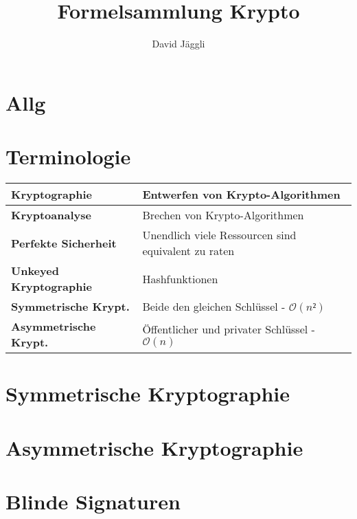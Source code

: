 \documentclass[12pt]{scrartcl}
\author{David Jäggli}
\title{Formelsammlung Krypto}
\begin{document}
\maketitle

\tableofcontents

\newpage
\section{Allg}


\section{Terminologie}


\renewcommand{\arraystretch}{1.5}
\begin{center}
    \begin{tabular}{ | m{12em} | m{25em} | }
        \hline
        \textbf{Kryptographie}         & Entwerfen von Krypto-Algorithmen                       \\
        \hline
        \textbf{Kryptoanalyse}         & Brechen von Krypto-Algorithmen                         \\
        \hline
        \textbf{Perfekte Sicherheit}   & Unendlich viele Ressourcen sind equivalent zu raten    \\
        \hline
        \textbf{Unkeyed Kryptographie} & Hashfunktionen                                         \\
        \hline
        \textbf{Symmetrische Krypt.}   & Beide den gleichen Schlüssel - $\mathcal{O}(n²)$       \\
        \hline
        \textbf{Asymmetrische Krypt.}  & Öffentlicher und privater Schlüssel - $\mathcal{O}(n)$ \\
        \hline
    \end{tabular}
\end{center}


\section{Symmetrische Kryptographie}

\section{Asymmetrische Kryptographie}

\newpage
\section{Blinde Signaturen}
\end{document}
